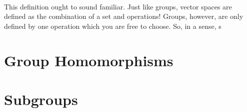 \documentclass{article}
\begin{document}
\paragraph*{} This definition ought to sound familiar. Just like groups, 
vector spaces are defined as the combination of a set and operations! Groups, 
however, are only defined by one operation which you are free to choose. So, 
in a sense, s

\section{Group Homomorphisms} 

\section{Subgroups}
\end{document}
